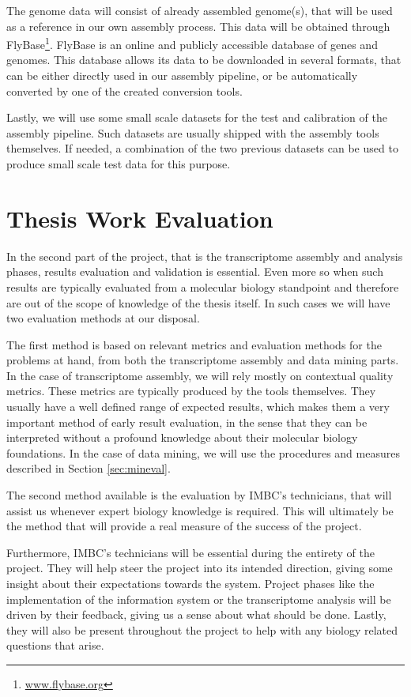 The genome data will consist of already assembled \fly{} genome(s), that will be
used as a reference in our own assembly process. This data will be obtained
through FlyBase\footnote{\url{www.flybase.org}}. FlyBase is an online and
publicly accessible database of \Fly{} genes and genomes. This database allows
its data to be downloaded in several formats, that can be either directly used
in our assembly pipeline, or be automatically converted by one of the created
conversion tools.

Lastly, we will use some small scale datasets for the test and calibration of the
assembly pipeline. Such datasets are usually shipped with the assembly tools
themselves. If needed, a combination of the two previous datasets can be used to
produce small scale test data for this purpose.

\section{Thesis Work Evaluation}\label{sec:eval}

In the second part of the project, that is the transcriptome assembly and
analysis phases, results evaluation and validation is essential. Even more so
when such results are typically evaluated from a molecular biology standpoint and
therefore are out of the scope of knowledge of the thesis itself. In such cases
we will have two evaluation methods at our disposal.

The first method is based on relevant metrics and evaluation methods for the
problems at hand, from both the transcriptome assembly and data mining parts. In
the case of transcriptome assembly, we will rely mostly on contextual quality
metrics. These metrics are typically produced by the tools themselves. They
usually have a well defined range of expected results, which makes them a very
important method of early result evaluation, in the sense that they can be
interpreted without a profound knowledge about their molecular biology
foundations. In the case of data mining, we will use the procedures  and
measures described in Section \ref{sec:mineval}.

The second method available is the evaluation by IMBC's technicians, that will
assist us whenever expert biology knowledge is required. This will ultimately be
the method that will provide a real measure of the success of the project.

Furthermore, IMBC's technicians will be essential during the entirety of the project. They
will help steer the project into its intended direction, giving some insight
about their expectations towards the system. Project phases like the
implementation of the information system or the transcriptome analysis will be
driven by their feedback, giving us a sense about what should be done. Lastly,
they will also be present throughout the project to help with any biology
related questions that arise.
